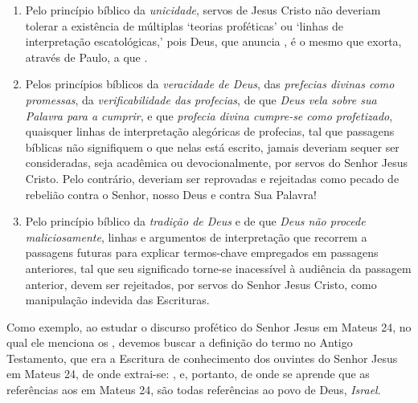     \begin{enumerate}

        \item Pelo princípio bíblico da \emph{unicidade}, servos de Jesus Cristo não deveriam tolerar  a  existência
            de múltiplas `teorias proféticas' ou `linhas de interpretação escatológicas,'  pois  Deus,  que  anuncia
            , é o mesmo que  exorta,  através  de  Paulo,  a  que  .

        \item Pelos princípios bíblicos da \emph{veracidade de Deus}, das \emph{prefecias divinas  como  promessas},
            da \emph{verificabilidade das profecias}, de que \emph{Deus vela sobre sua Palavra para  a  cumprir},  e
            que \emph{profecia divina cumpre-se como profetizado}, quaisquer linhas de interpretação  alegóricas  de
            profecias, tal que passagens bíblicas não signifiquem o que nelas está escrito, jamais  deveriam  sequer
            ser consideradas, seja acadêmica ou devocionalmente, por servos do Senhor Jesus Cristo. Pelo  contrário,
            deveriam ser reprovadas e rejeitadas como pecado de rebelião contra o Senhor, nosso Deus  e  contra  Sua
            Palavra!

        \item Pelo princípio bíblico da \emph{tradição de Deus} e de que  \emph{Deus  não  procede  maliciosamente},
            linhas e argumentos de interpretação  que  recorrem  a  passagens  futuras  para  explicar  termos-chave
            empregados em passagens anteriores, tal que seu significado torne-se inacessível à audiência da passagem
            anterior, devem ser rejeitados, por servos  do  Senhor  Jesus  Cristo,  como  manipulação  indevida  das
            Escrituras.

    \end{enumerate}

    Como exemplo, ao estudar o discurso profético do Senhor Jesus em Mateus 24, no qual  ele  menciona  os  ,
    devemos buscar a definição do termo no Antigo Testamento, que era a Escritura de conhecimento dos ouvintes do  Senhor  Jesus
    em Mateus 24, de onde extrai-se: , e, portanto, de onde  se  aprende  que  as  referências  aos
     em Mateus 24, são todas referências ao povo de Deus, \emph{Israel}.

